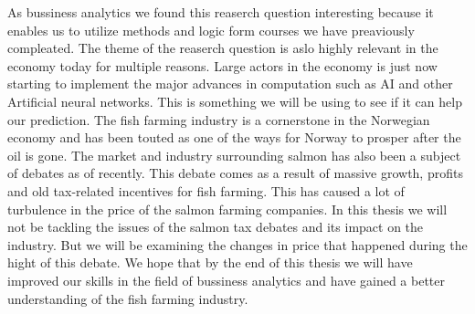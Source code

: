 As bussiness analytics we found this reaserch question interesting because it enables us to utilize  methods and logic form courses we have preaviously compleated.
The theme of the reaserch question is aslo highly relevant in the economy today for multiple reasons. Large actors in the economy is just now starting to implement the major advances in computation such as AI and other Artificial neural networks. This is something we will be using to see if it can help our prediction. The fish farming industry is a cornerstone in the Norwegian economy and has been touted as one of the ways for Norway to prosper after the oil is gone. The market and industry surrounding salmon has also been a subject of debates as of recently. This debate comes as a result of massive growth, profits and old tax-related incentives for fish farming. This has caused a lot of turbulence in the price of the salmon farming companies. In this thesis we will not be tackling the issues of the salmon tax debates and its impact on the industry. But we will be examining the changes in price that happened during the hight of this debate. We hope that by the end of this thesis we will have improved our skills in the field of bussiness analytics and have gained a better understanding of the fish farming industry.
